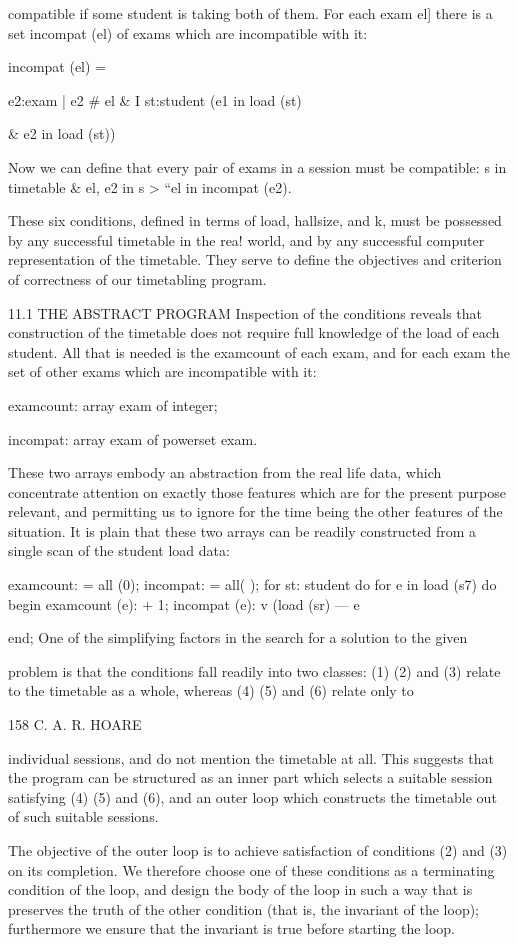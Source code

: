 {	compatible if some student is taking both of them. For each exam el] there is a set incompat (el) of exams which are incompatible with it:
	
	incompat (el) = {e2:exam | e2 # el & I st:student (e1 in load (st)
		
		& e2 in load (st))}
	
	Now we can define that every pair of exams in a session must be compatible: s in timetable & el, e2 in s > “el in incompat (e2).
	
	These six conditions, defined in terms of load, hallsize, and k, must be possessed by any successful timetable in the rea! world, and by any successful computer representation of the timetable. They serve to define the objectives and criterion of correctness of our timetabling program.
	
	11.1 THE ABSTRACT PROGRAM Inspection of the conditions reveals that construction of the timetable does not require full knowledge of the load of each student. All that is needed is the examcount of each exam, and for each exam the set of other exams which are incompatible with it:
	
	examcount: array exam of integer;
	
	incompat: array exam of powerset exam.
	
	These two arrays embody an abstraction from the real life data, which concentrate attention on exactly those features which are for the present purpose relevant, and permitting us to ignore for the time being the other features of the situation. It is plain that these two arrays can be readily constructed from a single scan of the student load data:
	
	examcount: = all (0); incompat: = all( { } ); for st: student do for e in load (s7) do begin examcount (e): + 1; incompat (e): v (load (sr) — {e}} end; One of the simplifying factors in the search for a solution to the given

problem is that the conditions fall readily into two classes: (1) (2) and (3) relate to the timetable as a whole, whereas (4) (5) and (6) relate only to

158 C. A. R. HOARE

individual sessions, and do not mention the timetable at all. This suggests that the program can be structured as an inner part which selects a suitable session satisfying (4) (5) and (6), and an outer loop which constructs the timetable out of such suitable sessions.

The objective of the outer loop is to achieve satisfaction of conditions (2) and (3) on its completion. We therefore choose one of these conditions as a terminating condition of the loop, and design the body of the loop in such a way that is preserves the truth of the other condition (that is, the invariant of the loop); furthermore we ensure that the invariant is true before starting the loop.

